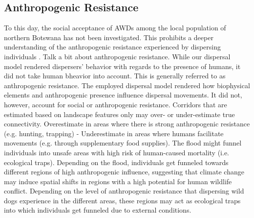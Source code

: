 \documentclass[abstract=on,10pt,a4paper,bibliography=totocnumbered]{article}
\begin{document}
\subsection{Anthropogenic Resistance}
To this day, the social acceptance of AWDs among the local population of
northern Botswana has not been investigated. This prohibits a deeper
understanding of the anthropogenic resistance experienced by dispersing
individuals \citep{Ghoddousi.2021}. Talk a bit about anthropogenic resistance.
While our dispersal model rendered dispersers' behavior with regards to the
presence of humans, it did not take human bheavior into account. This is
generally referred to as anthropogenic resistance. The employed dispersal model
rendered how biophysical elements and anthropogenic presence influence dispersal
movements. It did not, however, account for social or anthropogenic resistance.
Corridors that are estimated based on landscape features only may over- or
under-estimate true connectivity. Overestimate in areas where there is strong
anthropogenic resistance (e.g. hunting, trapping) - Underestimate in areas where
humans facilitate movements (e.g. through supplementary food supplies). The
flood might funnel individuals into unsafe areas with high risk of human-caused
mortality \citep{Northrup.2012} (i.e. ecological traps). Depending on the flood,
individuals get funneled towards different regions of high anthropogenic
influence, suggesting that climate change may induce spatial shifts in regions
with a high potential for human wildlife conflict. Depending on the level of
anthropogenic resistance that dispersing wild dogs experience in the different
areas, these regions may act as ecological traps into which individuals get
funneled due to external conditions.


\end{document}
